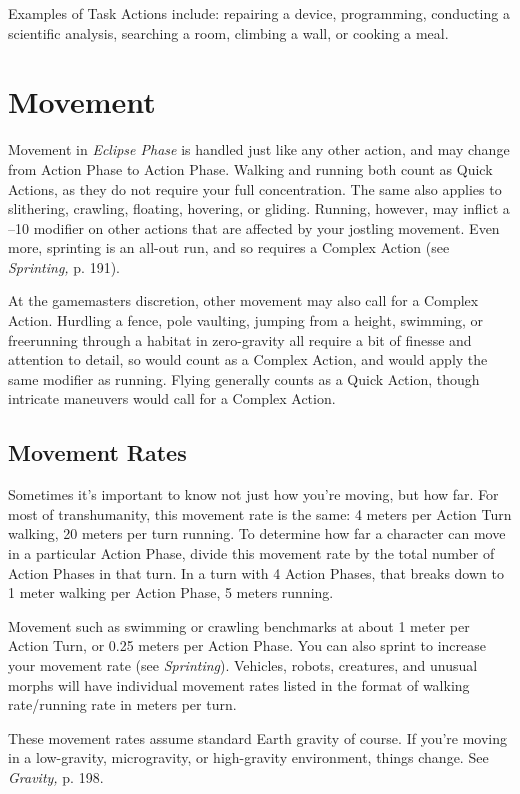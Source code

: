 Examples of Task Actions include: repairing a 
device, programming, conducting a scientific analysis, 
searching a room, climbing a wall, or cooking a meal.

\section{Movement}

Movement in \textit{Eclipse Phase} is handled just like any 
other action, and may change from Action Phase to 
Action Phase. Walking and running both count as Quick 
Actions, as they do not require your full concentration. 
The same also applies to slithering, crawling, floating, 
hovering, or gliding. Running, however, may inflict a 
–10 modifier on other actions that are affected by your 
jostling movement. Even more, sprinting is an all-out run, 
and so requires a Complex Action (see \textit{Sprinting,} p. 191).

At the gamemasters discretion, other movement 
may also call for a Complex Action. Hurdling a fence, 
pole vaulting, jumping from a height, swimming, or 
freerunning through a habitat in zero-gravity all require
a bit of finesse and attention to detail, so would
count as a Complex Action, and would apply the 
same modifier as running. Flying generally counts as a 
Quick Action, though intricate maneuvers would call 
for a Complex Action.

\subsection{Movement Rates}

Sometimes it's important to know not just how you're 
moving, but how far. For most of transhumanity, this 
movement rate is the same: 4 meters per Action Turn 
walking, 20 meters per turn running. To determine 
how far a character can move in a particular Action 
Phase, divide this movement rate by the total number 
of Action Phases in that turn. In a turn with 4 Action 
Phases, that breaks down to 1 meter walking per 
Action Phase, 5 meters running. 

Movement such as swimming or crawling benchmarks
at about 1 meter per Action Turn, or 0.25
meters per Action Phase. You can also sprint to increase
your movement rate (see \textit{Sprinting}). Vehicles,
robots, creatures, and unusual morphs will have individual
movement rates listed in the format of walking
rate/running rate in meters per turn.

These movement rates assume standard Earth 
gravity of course. If you're moving in a low-gravity, 
microgravity, or high-gravity environment, things 
change. See \textit{Gravity,} p. 198.

